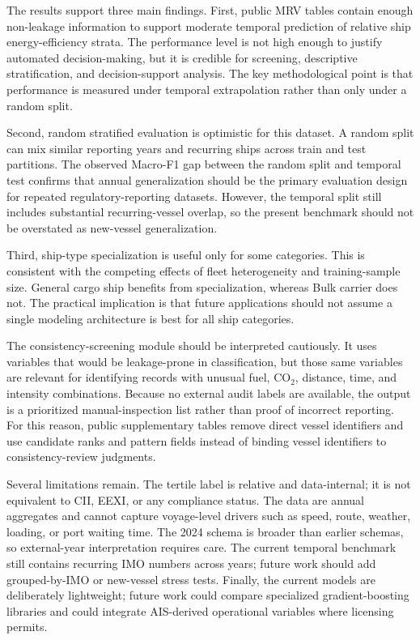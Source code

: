 \documentclass[preprints,article,submit,pdftex,oneauthor]{Definitions/mdpi}
\begin{document}
The results support three main findings. First, public MRV tables contain enough non-leakage information to support moderate temporal prediction of relative ship energy-efficiency strata. The performance level is not high enough to justify automated decision-making, but it is credible for screening, descriptive stratification, and decision-support analysis. The key methodological point is that performance is measured under temporal extrapolation rather than only under a random split.

Second, random stratified evaluation is optimistic for this dataset. A random split can mix similar reporting years and recurring ships across train and test partitions. The observed Macro-F1 gap between the random split and temporal test confirms that annual generalization should be the primary evaluation design for repeated regulatory-reporting datasets. However, the temporal split still includes substantial recurring-vessel overlap, so the present benchmark should not be overstated as new-vessel generalization.

Third, ship-type specialization is useful only for some categories. This is consistent with the competing effects of fleet heterogeneity and training-sample size. General cargo ship benefits from specialization, whereas Bulk carrier does not. The practical implication is that future applications should not assume a single modeling architecture is best for all ship categories.

The consistency-screening module should be interpreted cautiously. It uses variables that would be leakage-prone in classification, but those same variables are relevant for identifying records with unusual fuel, CO$_2$, distance, time, and intensity combinations. Because no external audit labels are available, the output is a prioritized manual-inspection list rather than proof of incorrect reporting. For this reason, public supplementary tables remove direct vessel identifiers and use candidate ranks and pattern fields instead of binding vessel identifiers to consistency-review judgments.

Several limitations remain. The tertile label is relative and data-internal; it is not equivalent to CII, EEXI, or any compliance status. The data are annual aggregates and cannot capture voyage-level drivers such as speed, route, weather, loading, or port waiting time. The 2024 schema is broader than earlier schemas, so external-year interpretation requires care. The current temporal benchmark still contains recurring IMO numbers across years; future work should add grouped-by-IMO or new-vessel stress tests. Finally, the current models are deliberately lightweight; future work could compare specialized gradient-boosting libraries and could integrate AIS-derived operational variables where licensing permits.
\end{document}
